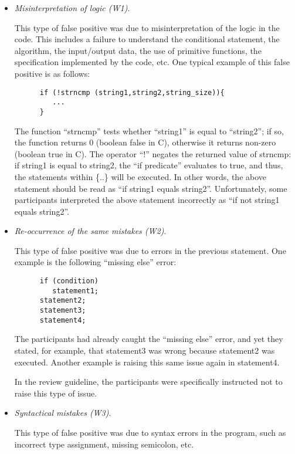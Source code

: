 \begin{itemize}

\item {\it Misinterpretation of logic (W1)}. 

This type of false positive was due to misinterpretation of
the logic in the code.  This includes a failure to
understand the conditional statement, the algorithm, the
input/output data, the use of primitive functions, the
specification implemented by the code, etc.  One typical
example of this false positive is as follows:

\small
\begin{verbatim}
      if (!strncmp (string1,string2,string_size)){ 
         ... 
      }
\end{verbatim}
\normalsize

The function ``strncmp'' tests whether ``string1'' is equal
to ``string2''; if so, the function returns 0 (boolean false
in C), otherwise it returns non-zero (boolean true in
C). The operator ``!'' negates the returned value of
strncmp: if string1 is equal to string2, the ``if
predicate'' evaluates to true, and thus, the statements
within \{..\} will be executed. In other words, the above
statement should be read as ``if string1 equals string2''.
Unfortunately, some participants interpreted the above
statement incorrectly as ``if not string1 equals string2''.

\item {\it Re-occurrence of the same mistakes (W2)}. 

This type of false positive was due to errors in the
previous statement.  One example is the following ``missing
else'' error:

\small
\begin{verbatim}
      if (condition)
         statement1;
      statement2;
      statement3;
      statement4; 
\end{verbatim}
\normalsize

The participants had already caught the ``missing else''
error, and yet they stated, for example, that statement3 was
wrong because statement2 was executed.  Another example is
raising this same issue again in statement4.

In the review guideline, the participants were specifically
instructed not to raise this type of issue.

\item {\it Syntactical mistakes (W3)}. 

This type of false positive was due to syntax errors in the
program, such as incorrect type assignment, missing
semicolon, etc.


\end{itemize}
